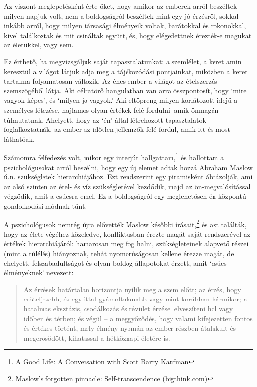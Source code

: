 
\enlargethispage*{\baselineskip}

Az viszont meglepetésként érte őket, hogy amikor az emberek arról
beszéltek milyen napjuk volt, nem a boldogságról beszéltek mint egy jó
érzésről, sokkal inkább arról, hogy milyen társasági élményeik voltak,
barátokkal és rokonokkal, kivel találkoztak és mit csináltak együtt, és,
hogy elégedettnek érezték-e magukat az életükkel, vagy sem.

Ez érthető, ha megvizsgáljuk saját tapasztalatunkat: a szemlélet, a
keret amin keresztül a világot látjuk adja meg a tájékozódási
pontjainkat, miközben a keret tartalma folyamatosan változik. Az éhes
ember a világot az ételszerzés szemszögéből látja. Aki célratörő
hangulatban van arra összpontosít, hogy `mire vagyok képes', és `milyen
jó vagyok.' Aki eltöpreng milyen korlátozott idejű a személyes létezése,
hajlamos olyan értékek felé fordulni, amik önmagán túlmutatnak.
Ahelyett, hogy az `én' által létrehozott tapasztalatok foglalkoztatnák,
az ember az időtlen jellemzők felé fordul, amik itt és most láthatóak.

Számomra felfedezés volt, mikor egy interjút hallgattam,\footnote{\href{https://www.samharris.org/podcasts/making-sense-episodes/209-a-good-life}{A
  Good Life: A Conversation with Scott Barry Kaufman}} és hallottam a
pszichológusokat arról beszélni, hogy egy új elemet adtak hozzá Abraham
Maslow ú.n. szükségletek hierarchiájához. Ezt rendszerint egy
piramisként ábrázolják, ami az alsó szinten az étel- és víz
szükségletével kezdődik, majd az ön-megvalósítással végződik, amit a
csúcsra emel. Ez a boldogságról egy meglehetősen én-központú
gondolkodási módnak tűnt.

\enlargethispage*{\baselineskip}

A pszichológusok nemrég újra elővették Maslow későbbi
írásait,\footnote{\href{https://bigthink.com/neuropsych/maslow-self-transcendence/}{Maslow's
  forgotten pinnacle: Self-transcendence (bigthink.com)}} és azt
találták, hogy az élete végéhez közeledve, konfliktusban érezte magát
saját rendszerével az értékek hierarchiájáról: hamarosan meg fog halni,
szükségleteinek alapvető részei (mint a túlélés) hiányoznak, tehát
nyomorúságosan kellene érezze magát, de ehelyett, felszabadultságot és
olyan boldog állapotokat érzett, amit `csúcs-élményeknek' nevezett:

\begin{quote}
Az érzések határtalan horizontja nyílik meg a szem előtt; az érzés, hogy
erőteljesebb, és egyúttal gyámoltalanabb vagy mint korábban bármikor; a
hatalmas eksztázis, csodálkozás és révület érzése; elveszíteni hol vagy
időben és térben; és végül -- a meggyőződés, hogy valami kifejezetten
fontos és értékes történt, mely élmény nyomán az ember részben átalakult
és megerősödött, kihatással a hétköznapi életére is.
\end{quote}

